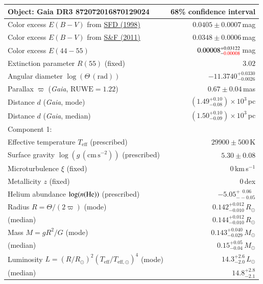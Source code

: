 \documentclass{standalone}
\begin{document}
\renewcommand{\arraystretch}{1.2}
\begin{tabular}{lr}
\hline\hline
Object: Gaia DR3 872072016870129024 & 68\% confidence interval\\
\hline
Color excess $E(B-V)$ from \href{https://ui.adsabs.harvard.edu/abs/1998ApJ...500..525S/abstract}{SFD (1998)} & $0.0405 \pm 0.0007$\,mag \\
Color excess $E(B-V)$ from \href{https://ui.adsabs.harvard.edu/abs/2011ApJ...737..103S/abstract}{S\&F (2011)} & $0.0348 \pm 0.0006$\,mag \\
\hline
Color excess $E(44-55)$ & $0.00008^{+0.03122}_{-{\color{red}0.00008}}$\,mag \\
Extinction parameter $R(55)$ (fixed) & $3.02$ \\
Angular diameter $\log(\Theta\,\mathrm{(rad)})$ & $-11.3740^{+0.0330}_{-0.0026}$ \\
Parallax $\varpi$ ({\it Gaia}, $\text{RUWE}=1.22$) & $0.67 \pm 0.04$\,mas \\
Distance $d$ ({\it Gaia}, mode) & $\left(1.49^{+0.10}_{-0.08}\right)\times10^{3}$\,pc \\
Distance $d$ ({\it Gaia}, median) & $\left(1.50^{+0.10}_{-0.09}\right)\times10^{3}$\,pc \\
\hline
\multicolumn{2}{l}{Component 1:} \\
Effective temperature $T_{\mathrm{eff}}$ (prescribed) & $29900 \pm 500$\,K \\
Surface gravity $\log (g\,\mathrm{(cm\,s^{-2})})$ (prescribed) & $5.30 \pm 0.08$ \\
Microturbulence $\xi$ (fixed) & $0$\,km\,s$^{-1}$ \\
Metallicity $z$ (fixed) & $0$\,dex \\
Helium abundance $\log(n(\textnormal{He}))$ (prescribed) & $-5.05^{+\phantom{0}0.06}_{--0.05}$ \\
Radius $R = \Theta/(2\varpi)$ (mode) & $0.142^{+0.012}_{-0.010}$\,$R_\odot$ \\
\phantom{Radius $R = \Theta/(2\varpi)$ }(median) & $0.144^{+0.012}_{-0.010}$\,$R_\odot$ \\
Mass $M = g R^2/G$ (mode) & $0.143^{+0.040}_{-0.029}$\,$M_\odot$ \\
\phantom{Mass $M = g R^2/G$ }(median) & $0.15^{+0.05}_{-0.04}$\,$M_\odot$ \\
Luminosity $L = (R/R_\odot)^2(T_\mathrm{eff}/T_{\mathrm{eff},\odot})^4$ (mode) & $14.3^{+2.6}_{-2.0}$\,$L_\odot$ \\
\phantom{Luminosity $L/L_\odot = (R/R_\odot)^2(T_\mathrm{eff}/T_{\mathrm{eff},\odot})^4$ }(median) & $14.8^{+2.8}_{-2.1}$ \\

\end{tabular}
\end{document}
